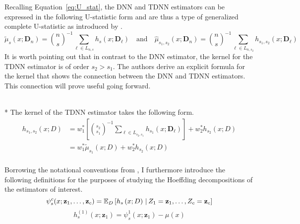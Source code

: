 Recalling Equation~\ref{eq:U_stat}, the DNN and TDNN estimators can be expressed in the following U-statistic form and are thus a type of generalized complete U-statistic as introduced by \citet{peng_rates_2022}.
\begin{equation}
	\tilde{\mu}_{s}(x; \mathbf{D}_n)
	= \binom{n}{s}^{-1} \sum_{\ell \in L_{n,s}} h_{s}(x; \mathbf{D}_{\ell})
	\quad \text{and} \quad
	\hat{\mu}_{s_1, s_2}(x; \mathbf{D}_n)
	= \binom{n}{s}^{-1} \sum_{\ell \in L_{n,s_2}} h_{s_1, s_2}(x; \mathbf{D}_{\ell})
\end{equation}
It is worth pointing out that in contrast to the DNN estimator, the kernel for the TDNN estimator is of order $s_2 > s_1$.
The authors derive an explicit formula for the kernel that shows the connection between the DNN and TDNN estimators.
This connection will prove useful going forward.
\begin{boxD}
	\begin{lem}\label{lem:dem8}\mbox{}\\*
		The kernel of the TDNN estimator takes the following form.
		\begin{equation}
			\begin{aligned}
				h_{s_1, s_2}\left(x; D\right)
				 & = w_{1}^{*}\left[\binom{s_2}{s_1}^{-1}\sum_{\ell \in L_{s_2, s_1}} h_{s_1}\left(x; \mathbf{D}_{\ell}\right)\right] + w_{2}^{*} h_{s_2}\left(x; D\right) \\
				 & = w_{1}^{*} \tilde{\mu}_{s_1}\left(x; D\right) + w_{2}^{*} h_{s_2}\left(x; D\right)                                                            \\
			\end{aligned}
		\end{equation}
	\end{lem}
\end{boxD}
Borrowing the notational conventions from \citet{lee_u-statistics_2019}, I furthermore introduce the following definitions for the purposes of studying the Hoeffding decompositions of the estimators of interest.
\begin{equation}\label{eq:psi_s_c}
	\psi_{s}^{c}(x; \mathbf{z}_{1}, \dotsc, \mathbf{z}_{c})
	= \mathbb{E}_{D}\left[h_{s}\left(x; D\right) \, | \,  Z_1 = \mathbf{z}_{1}, \dotsc, Z_c = \mathbf{z}_{c}\right]
\end{equation}
\begin{equation}
	h_{s}^{(1)}\left(x; \mathbf{z}_{1}\right)
	= \psi_{s}^{1}(x; \mathbf{z}_{1}) - \mu(x)
\end{equation}
